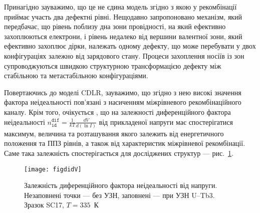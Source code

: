 Принагідно зауважимо, що це не єдина модель згідно з якою у рекомбінації приймає участь два
дефектні рівні.
Нещодавно \cite{TwoLevelRecomb} запропоновано механізм, який передбачає, що рівень поблизу дна зони провідності,
на який ефективно захоплюються електрони, і рівень недалеко від вершини валентної зони, який ефективно захоплює дірки,
належать одному дефекту, що може перебувати у двох конфігураціях залежно від зарядового стану.
Процеси захоплення носіїв із зон супроводжуються швидкою структурною трансформацією дефекту між стабільною та метастабільною конфігураціями.

Повертаючись до моделі CDLR,
зауважимо, що згідно з нею високі значення фактора неідеальності пов'язані з насиченням
міжрівневого рекомбінаційного каналу.
Крім того, очікується \cite{CDLR:JAP,Breitenstein2013}, що
на залежності диференційного фактора неідеальності
$n_\mathtt{id}^\mathtt{dif}=\frac{1}{kT}\frac{dV}{d(\ln I)}$ від прикладеної напруги має
спостерігатися максимум, величина та розташування якого залежить від енергетичного положення та
ППЗ рівнів, а також від характеристик міжрівневої рекомбінації.
Саме така залежність спостерігається для досліджених структур --- рис.~\ref{figdidV}.

\begin{figure}
\center
\texttt{[image: figdidV]}%
\caption{\label{figdidV}
Залежність диференційного фактора неідеальності від напруги.
Незаповнені точки --- без УЗН, заповнені --- при УЗН U--Tb3.
Зразок SC17, $T=335$~К
}%
\end{figure}

